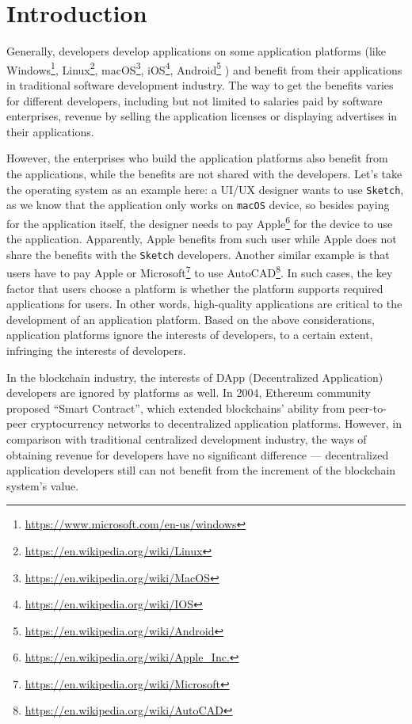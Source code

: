 \section{Introduction}

Generally, developers develop applications on some application platforms (like
Windows\footnote{\url{https://www.microsoft.com/en-us/windows}}, Linux\footnote{\url{https://en.wikipedia.org/wiki/Linux}},
macOS\footnote{\url{https://en.wikipedia.org/wiki/MacOS}},
iOS\footnote{\url{https://en.wikipedia.org/wiki/IOS}},
Android\footnote{\url{https://en.wikipedia.org/wiki/Android}} \etc) and
benefit from their applications in traditional software development industry.
The way to get the benefits varies for different developers, including but not
limited to salaries paid by software enterprises, revenue by selling the
application licenses or displaying advertises in their applications.

However, the enterprises who build the application platforms also benefit
from the applications, while the benefits are not shared with the developers.
Let's take the operating system as an example here: a UI/UX designer wants to use \texttt{Sketch},
as we know that the application only works on \texttt{macOS} device, so besides
paying for the application itself, the designer needs to pay Apple\footnote{\url{https://en.wikipedia.org/wiki/Apple_Inc.}}
for the device  to use the application. Apparently, Apple benefits from such user while
Apple does not share the benefits with the \texttt{Sketch} developers.
Another similar example is that users have to pay Apple or
Microsoft\footnote{\url{https://en.wikipedia.org/wiki/Microsoft}} to use
AutoCAD\footnote{\url{https://en.wikipedia.org/wiki/AutoCAD}}. In such cases,
the key factor that users choose a platform is whether the platform
supports required applications for users. In other words, high-quality
applications are critical to the development of an application platform. Based on the above considerations,  application platforms ignore the interests of developers, to a certain extent, infringing the interests of developers.

In the blockchain industry, the interests of
DApp (Decentralized Application) developers are ignored by platforms  as  well.
 In 2004, Ethereum community proposed ``Smart Contract'',
which extended blockchains' ability from peer-to-peer
cryptocurrency networks to decentralized application platforms. However, in
comparison with traditional centralized development industry, the ways of
obtaining revenue for developers have no significant difference --- decentralized application developers still can not benefit
 from the increment of the blockchain system's value.

